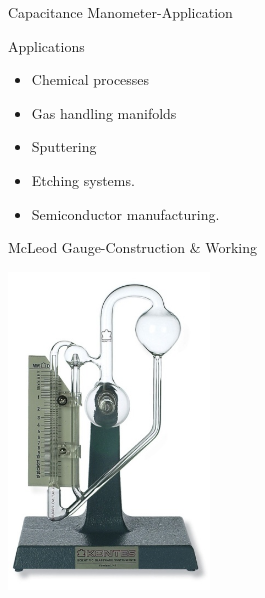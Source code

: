 \documentclass[11pt]{beamer}
\begin{document}
\begin{frame}{Capacitance Manometer-Application}

     \begin{exampleblock}{Applications}
          
       \begin{itemize}
      		 \item Chemical processes
 			 \item Gas handling manifolds
  			 \item Sputtering
  			 \item Etching systems.
  			 \item Semiconductor manufacturing.
       \end{itemize}                
   
       
       \end{exampleblock}

\end{frame}






\begin{frame}{McLeod Gauge-Construction \& Working }

\begin{exampleblock}{}
          \begin{center}
			\includegraphics[width=0.4\textwidth]{Macleod.png}
		\end{center}
       \end{exampleblock}

\end{frame}
\end{document}
